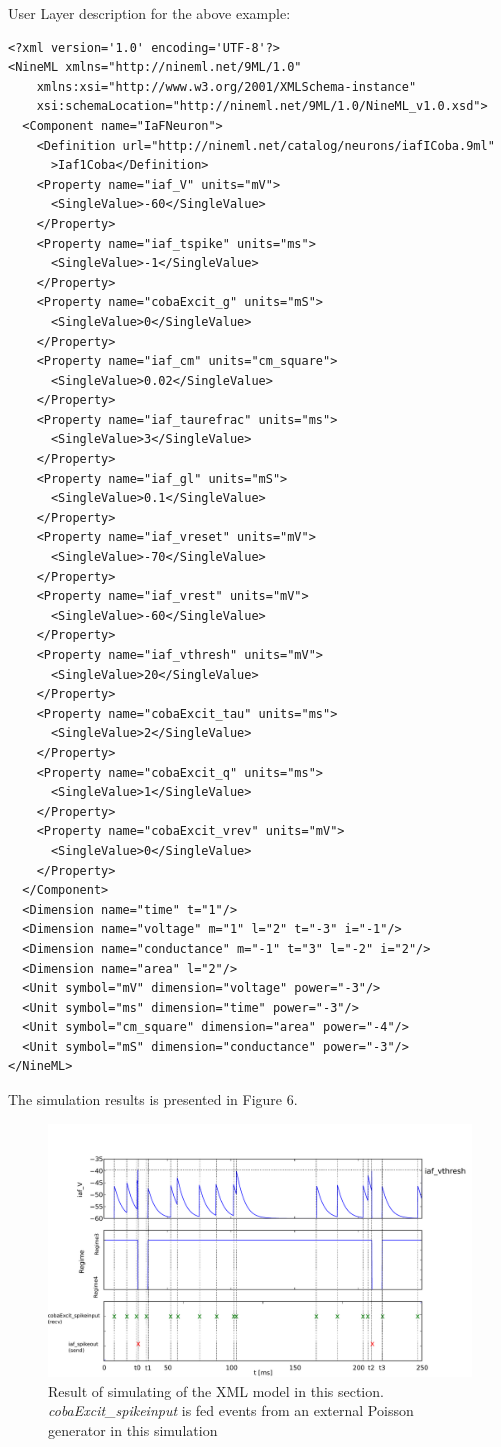 \documentclass[draftspec]{ninemlspec}
\begin{document}
User Layer description for the above example:
\begin{lstlisting}
<?xml version='1.0' encoding='UTF-8'?>
<NineML xmlns="http://nineml.net/9ML/1.0"
    xmlns:xsi="http://www.w3.org/2001/XMLSchema-instance"
    xsi:schemaLocation="http://nineml.net/9ML/1.0/NineML_v1.0.xsd">
  <Component name="IaFNeuron">
    <Definition url="http://nineml.net/catalog/neurons/iafICoba.9ml"
      >Iaf1Coba</Definition>
    <Property name="iaf_V" units="mV">
      <SingleValue>-60</SingleValue>
    </Property>
    <Property name="iaf_tspike" units="ms">
      <SingleValue>-1</SingleValue>
    </Property>
    <Property name="cobaExcit_g" units="mS">
      <SingleValue>0</SingleValue>
    </Property>
    <Property name="iaf_cm" units="cm_square">
      <SingleValue>0.02</SingleValue>
    </Property>
    <Property name="iaf_taurefrac" units="ms">
      <SingleValue>3</SingleValue>
    </Property>
    <Property name="iaf_gl" units="mS">
      <SingleValue>0.1</SingleValue>
    </Property>
    <Property name="iaf_vreset" units="mV">
      <SingleValue>-70</SingleValue>
    </Property>
    <Property name="iaf_vrest" units="mV">
      <SingleValue>-60</SingleValue>
    </Property>
    <Property name="iaf_vthresh" units="mV">
      <SingleValue>20</SingleValue>
    </Property>
    <Property name="cobaExcit_tau" units="ms">
      <SingleValue>2</SingleValue>
    </Property>
    <Property name="cobaExcit_q" units="ms">
      <SingleValue>1</SingleValue>
    </Property>
    <Property name="cobaExcit_vrev" units="mV">
      <SingleValue>0</SingleValue>
    </Property>
  </Component>
  <Dimension name="time" t="1"/>
  <Dimension name="voltage" m="1" l="2" t="-3" i="-1"/>
  <Dimension name="conductance" m="-1" t="3" l="-2" i="2"/>
  <Dimension name="area" l="2"/>
  <Unit symbol="mV" dimension="voltage" power="-3"/>
  <Unit symbol="ms" dimension="time" power="-3"/>
  <Unit symbol="cm_square" dimension="area" power="-4"/>
  <Unit symbol="mS" dimension="conductance" power="-3"/>
</NineML>
\end{lstlisting}

The simulation results is presented in Figure 6.
\begin{figure}[htb!]
\center
\includegraphics[width=14cm]{figures/demo2_Coba1_out.pdf}
\protect\caption{Result of simulating of the XML model in this section.
\emph{cobaExcit\_spikeinput} is fed events from an external Poisson generator
in this simulation}
\label{fig:EX2_Output}
\end{figure}
\end{document}
